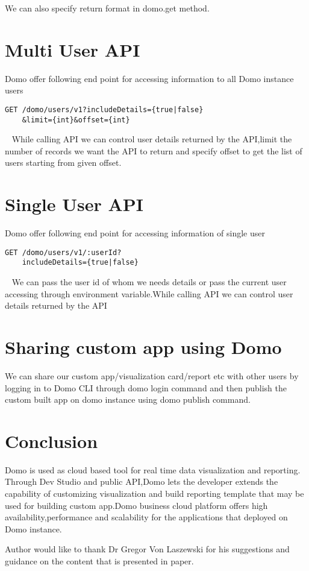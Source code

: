 We can also specify return format in domo.get method.


\section{Multi User API}
Domo offer following end point for accessing information to all
Domo instance users
\begin{verbatim}
GET /domo/users/v1?includeDetails={true|false}
	&limit={int}&offset={int}
\end{verbatim}
~\cite{hid-sp18-523-User}
While calling API we can control user details returned by the API,limit
the number of records we want the API to return and specify offset to get
the list of users starting from given offset. 
~\cite{hid-sp18-523-User} 

\section{Single User API}
Domo offer following end point for accessing information of single user
\begin{verbatim}
GET /domo/users/v1/:userId?
	includeDetails={true|false}
\end{verbatim}
~\cite{hid-sp18-523-User}
We can pass the user id of whom we needs details or pass the current user
accessing through environment variable.While calling API we can control 
user details returned by the API~\cite{hid-sp18-523-User} 


\section{Sharing custom app using Domo}
We can share our custom app/visualization card/report etc with other users
by logging in to Domo CLI through domo login command and then publish the 
custom built app on domo instance using domo publish command. 


\section{Conclusion}
Domo is used as cloud based tool for real time data visualization and 
reporting. Through Dev Studio and public API,Domo lets the developer
extends the capability of customizing visualization and build reporting
template that may be used for building custom app.Domo business cloud
platform offers high availability,performance and scalability for the
applications that deployed on Domo instance.


\begin{acks}

Author would like to thank Dr Gregor Von Laszewski for his suggestions 
and guidance on the content that is presented in paper.
\end{acks}


 

